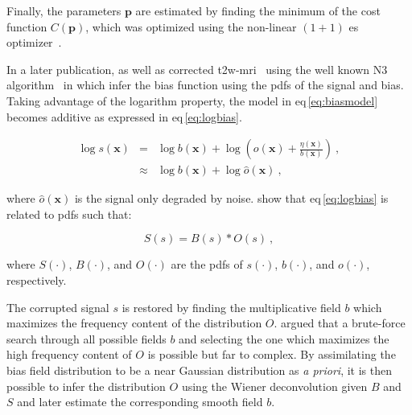 Finally, the parameters $\mathbf{p}$ are estimated by finding the minimum of the cost function $C(\mathbf{p})$, which was optimized using the non-linear $(1+1)$ \ac{es} optimizer~\cite{Styner1997}.

In a later publication, \citeauthor{Viswanath2012} as well as \citeauthor{giannini2015fully} corrected \ac{t2w}-\ac{mri}~\cite{Viswanath2012,giannini2015fully} using the well known N3 algorithm~\cite{Sled1998} in which \citeauthor{Sled1998} infer the bias function using the \acp{pdf} of the signal and bias.
Taking advantage of the logarithm property, the model in \acs{eq}\,\eqref{eq:biasmodel} becomes additive as expressed in \acs{eq}\,\eqref{eq:logbias}.

\begin{eqnarray}
	\log s(\mathbf{x}) & = & \log b(\mathbf{x}) + \log \left( o(\mathbf{x}) + \frac{\eta(\mathbf{x})}{b(\mathbf{x})} \right) \ , \nonumber \\
	& \approx & \log b(\mathbf{x}) + \log \hat{o}(\mathbf{x}) \ , \label{eq:logbias}
\end{eqnarray}

\noindent where $\hat{o}(\mathbf{x})$ is the signal only degraded by noise. \citeauthor{Sled1998} show that \acs{eq}\,\eqref{eq:logbias} is related to \acp{pdf} such that:

\begin{equation}
	S(s) = B(s) * O(s) \ ,
	\label{eq:distrbias} 
\end{equation}

\noindent where $S(\cdot)$, $B(\cdot)$, and $O(\cdot)$ are the \acp{pdf} of $s(\cdot)$, $b(\cdot)$, and $o(\cdot)$, respectively.

The corrupted signal $s$ is restored by finding the multiplicative field $b$ which maximizes the frequency content of the distribution $O$.
\citeauthor{Sled1998} argued that a brute-force search through all possible fields $b$ and selecting the one which maximizes the high frequency content of $O$ is possible but far to complex.
By assimilating the bias field distribution to be a near Gaussian distribution as \textit{a priori}, it is then possible to infer the distribution $O$ using the Wiener deconvolution given $B$ and $S$ and later estimate the corresponding smooth field $b$.

